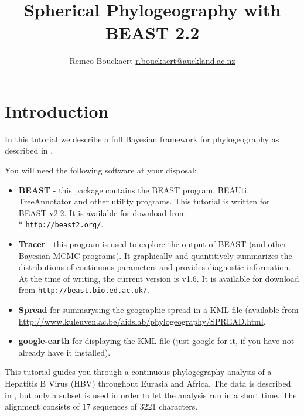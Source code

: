 \documentclass{article}
\newcommand{\BEASTVersion}{2.2}
\newcommand{\TracerVersion}{1.6}
\newcommand{\FigTreeVersion}{1.4.2}
\begin{document}
    \title{Spherical Phylogeography with BEAST \BEASTVersion}
\author{Remco Bouckaert \url{r.bouckaert@auckland.ac.nz}}
\maketitle

\section{Introduction}


In this tutorial we describe a full Bayesian framework for phylogeography as described in  \cite{sphericalgeo}.
 
You will need the following software at your disposal:

\begin{itemize}

\item {\bf BEAST} - this package contains the BEAST program, BEAUti, TreeAnnotator and other utility programs. This tutorial is written for BEAST v{\BEASTVersion}. It is available for download from \\* \texttt{http://beast2.org/}.
\item {\bf Tracer} - this program is used to explore the output of BEAST (and other Bayesian MCMC programs). It graphically and
quantitively summarizes the distributions of continuous parameters and provides diagnostic information. At the time of
writing, the current version is v{\TracerVersion}. It is available for download from \texttt{http://beast.bio.ed.ac.uk/}.
\item {\bf Spread} for summarysing the geographic spread in a KML file (available from \url{http://www.kuleuven.ac.be/aidslab/phylogeography/SPREAD.html}.
\item {\bf google-earth} for displaying the KML file (just google for it, if you have not already have it installed).
\end{itemize}


This tutorial guides you through a continuous phylogegraphy analysis of a Hepatitis B Virus (HBV) throughout Eurasia and Africa. The data is described in \cite{sphericalgeo}, but only a subset is used in order to let the analysis run in a short time. The alignment consists of 17 sequences of  3221 characters.
\end{document}
